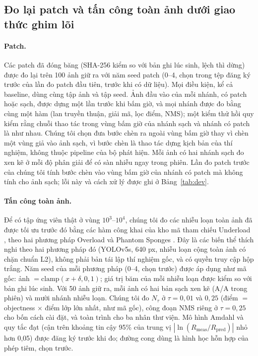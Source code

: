 \documentclass[a4paper,fleqn]{cas-dc}
\newcommand{\Ntau}{N_{\tau}}
\begin{document}
\subsection{Đo lại patch và tấn công toàn ảnh dưới giao thức ghim lõi}
\label{sec:attackdesign}
\paragraph{Patch.} Các patch đã đóng băng (SHA-256 kiểm so với bản ghi lúc sinh, lệch thì dừng) được đo lại trên 100 ảnh giữ ra với năm seed patch (0--4, chọn trong tệp đăng ký trước của lần đo patch đầu tiên, trước khi có dữ liệu). Mọi điều kiện, kể cả baseline, dùng cùng tập ảnh và tập seed. Ảnh đầu vào của mỗi nhánh, có patch hoặc sạch, được dựng một lần trước khi bấm giờ, và mọi nhánh được đo bằng cùng một hàm (lan truyền thuận, giải mã, lọc điểm, NMS); một kiểm thử hồi quy kiểm rằng chuỗi thao tác trong vùng bấm giờ của nhánh sạch và nhánh có patch là như nhau. Chúng tôi chọn đưa bước chèn ra ngoài vùng bấm giờ thay vì chèn một vùng giả vào ảnh sạch, vì bước chèn là thao tác dựng kịch bản của thí nghiệm, không thuộc pipeline của bộ phát hiện. Mỗi ảnh có hai nhánh sạch đo xen kẽ ở mỗi độ phân giải để có sàn nhiễu ngay trong phiên. Lần đo patch trước của chúng tôi tính bước chèn vào vùng bấm giờ của nhánh có patch mà không tính cho ảnh sạch; lỗi này và cách xử lý được ghi ở Bảng~\ref{tab:dev}.

\paragraph{Tấn công toàn ảnh.} Để có tập ứng viên thật ở vùng $10^3$--$10^4$, chúng tôi đo các nhiễu loạn toàn ảnh đã được tối ưu trước đó bằng các hàm công khai của kho mã tham chiếu Underload \cite{underload2025}, theo hai phương pháp Overload \cite{overload2024} và Phantom Sponges \cite{phantom2023}. Đây là các biến thể thích nghi theo hai phương pháp đó (YOLOv5s, 640 px, nhiễu loạn cộng toàn ảnh có chặn chuẩn L2), không phải bản tái lập thí nghiệm gốc, và có quyền truy cập hộp trắng. Năm seed của mỗi phương pháp (0--4, chọn trước) được áp dụng như mã gốc: ảnh $=\mathrm{clamp}(x+\delta,0,1)$; giá trị băm của mỗi nhiễu loạn được kiểm so với bản ghi lúc sinh. Với 50 ảnh giữ ra, mỗi ảnh có hai bản sạch xen kẽ (A/A trong phiên) và mười nhánh nhiễu loạn. Chúng tôi đo $\Ntau$ ở $\tau=0{,}01$ và $0{,}25$ (điểm $=$ objectness $\times$ điểm lớp lớn nhất, như mã gốc), công đoạn NMS riêng ở $\tau=0{,}25$ cho bốn cách cài đặt, và toàn trình cho ba nhân thư viện. Mô hình Amdahl và quy tắc đạt (cận trên khoảng tin cậy 95\% của trung vị $|\ln(R_{\mathrm{meas}}/R_{\mathrm{pred}})|$ nhỏ hơn 0,05) được đăng ký trước khi đo; đường cong dùng là hình học hỗn hợp của phép tiêm, chọn trước.
\end{document}
